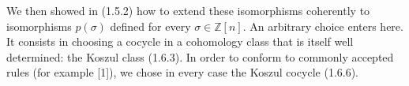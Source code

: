 \begin{center}
\end{center}

We then showed in (1.5.2) how to extend these isomorphisms coherently to
isomorphisms $p(\sigma)$ defined for every $\sigma\in\mathbb Z[n]$. An
arbitrary choice enters here. It consists in choosing a cocycle in a
cohomology class that is itself well determined: the Koszul class (1.6.3).
In order to conform to commonly accepted rules (for example [1]), we chose in
every case the Koszul cocycle (1.6.6).
\endgroup
